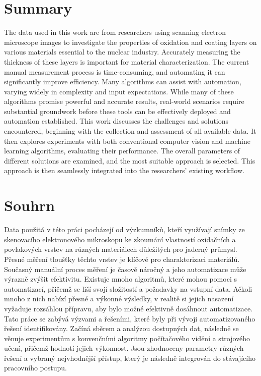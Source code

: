 \chapter*{Summary}
The data used in this work are from researchers using scanning electron microscope images to investigate the properties of oxidation and coating layers on various materials essential to the nuclear industry. Accurately measuring the thickness of these layers is important for material characterization. The current manual measurement process is time-consuming, and automating it can significantly improve efficiency. Many algorithms can assist with automation, varying widely in complexity and input expectations. While many of these algorithms promise powerful and accurate results, real-world scenarios require substantial groundwork before these tools can be effectively deployed and automation established. This work discusses the challenges and solutions encountered, beginning with the collection and assessment of all available data. It then explores experiments with both conventional computer vision and machine learning algorithms, evaluating their performance. The overall parameters of different solutions are examined, and the most suitable approach is selected. This approach is then seamlessly integrated into the researchers' existing workflow.
\newpage
\chapter*{Souhrn}
Data použitá v této práci pocházejí od výzkumníků, kteří využívají snímky ze skenovacího elektronového mikroskopu ke zkoumání vlastností oxidačních a povlakových vrstev na různých materiálech důležitých pro jaderný průmysl. Přesné měření tloušťky těchto vrstev je klíčové pro charakterizaci materiálů. Současný manuální proces měření je časově náročný a jeho automatizace může výrazně zvýšit efektivitu. Existuje mnoho algoritmů, které mohou pomoci s automatizací, přičemž se liší svojí složitostí a požadavky na vstupní data. Ačkoli mnoho z nich nabízí přesné a výkonné výsledky, v realitě si jejich nasazení vyžaduje rozsáhlou přípravu, aby bylo možné efektivně dosáhnout automatizace. Tato práce se zabývá výzvami a řešeními, které byly při vývoji automatizovaného řešení identifikovány. Začíná sběrem a analýzou dostupných dat, následně se věnuje experimentům s konvenčními algoritmy počítačového vidění a strojového učení, přičemž hodnotí jejich výkonnost. Jsou zhodnoceny parametry různých řešení a vybraný nejvhodnější přístup, který je následně integrován do stávajícího pracovního postupu.
\newpage




